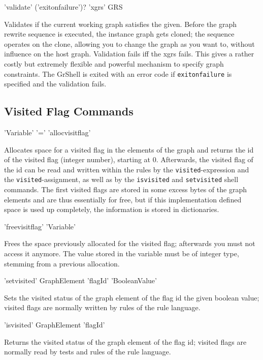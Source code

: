 \begin{rail}
  'validate' ('exitonfailure')? 'xgrs' GRS
\end{rail}
Validates if the current working graph satisfies the  given.
Before the graph rewrite sequence is executed, the instance graph gets cloned;
the sequence operates on the clone, allowing you to change the graph as you want to, without influence on the host graph.
Validation fails iff the xgrs fails.
This gives a rather costly but extremely flexible and powerful mechanism to specify graph constraints.
The GrShell is exited with an error code if \texttt{exitonfailure} is specified and the validation fails.


\subsection{Visited Flag Commands}

\begin{rail}
'Variable' '=' 'allocvisitflag'
\end{rail}\label{allocvisitflag}
Allocates space for a visited flag in the elements of the graph and returns the id of the visited flag (integer number), starting at 0.
Afterwards, the visited flag of the id can be read and written within the rules by the \texttt{visited}-expression and the \texttt{visited}-assignment,
as well as by the \texttt{isvisited} and \texttt{setvisited} shell commands.
The first visited flags are stored in some excess bytes of the graph elements and are thus essentially for free, but if this implementation defined space is used up completely, the information is stored in dictionaries.

\begin{rail}
'freevisitflag' 'Variable'
\end{rail}
Frees the space previously allocated for the visited flag; afterwards you must not access it anymore. 
The value stored in the variable must be of integer type, stemming from a previous allocation.

\begin{rail} 
'setvisited' GraphElement 'flagId' 'BooleanValue'
\end{rail}
Sets the visited status of the graph element of the flag id the given boolean value; visited flags are normally written by rules of the rule language.

\begin{rail}
'isvisited' GraphElement 'flagId'
\end{rail}
Returns the visited status of the graph element of the flag id; visited flags are normally read by tests and rules of the rule language.


